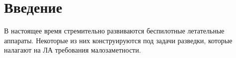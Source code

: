 \chapter{Введение}

В настоящее время стремительно развиваются беспилотные летательные аппараты. Некоторые из них конструируются под задачи разведки, которые налагают на ЛА требования малозаметности. 
\cite{AvWeekUAV}
